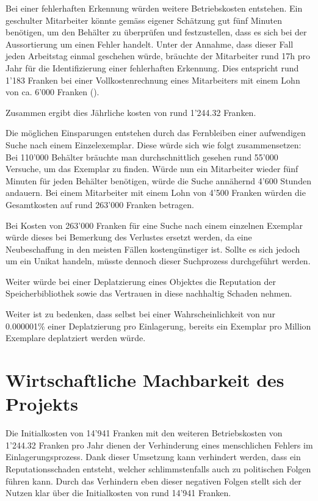 Bei einer fehlerhaften Erkennung würden weitere Betriebskosten entstehen. Ein geschulter Mitarbeiter könnte gemäss eigener Schätzung gut fünf Minuten benötigen, um den Behälter zu überprüfen und festzustellen, dass es sich bei der Aussortierung um einen Fehler handelt.
Unter der Annahme, dass dieser Fall jeden Arbeitstag einmal geschehen würde, bräuchte der Mitarbeiter rund 17h pro Jahr für die Identifizierung einer fehlerhaften Erkennung. Dies entspricht rund 1'183 Franken bei einer Vollkostenrechnung eines Mitarbeiters mit einem Lohn von ca. 6'000 Franken (\cite{KostenProMitarbeiter2013}).

Zusammen ergibt dies Jährliche kosten von rund 1'244.32 Franken.

Die möglichen Einsparungen entstehen durch das Fernbleiben einer aufwendigen Suche nach einem Einzelexemplar. Diese würde sich wie folgt zusammensetzen:
Bei 110'000 Behälter bräuchte man durchschnittlich gesehen rund 55'000 Versuche, um das Exemplar zu finden. Würde nun ein Mitarbeiter wieder fünf Minuten für jeden Behälter benötigen, würde die Suche annähernd 4'600 Stunden andauern. Bei einem Mitarbeiter mit einem Lohn von 4'500 Franken würden die Gesamtkosten auf rund 263'000 Franken betragen.

Bei Kosten von 263'000 Franken für eine Suche nach einem einzelnen Exemplar würde dieses bei Bemerkung des Verlustes ersetzt werden, da eine Neubeschaffung in den meisten Fällen kostengünstiger ist. Sollte es sich jedoch um ein Unikat handeln, müsste dennoch dieser Suchprozess durchgeführt werden.

Weiter würde bei einer Deplatzierung eines Objektes die Reputation der Speicherbibliothek sowie das Vertrauen in diese nachhaltig Schaden nehmen.

Weiter ist zu bedenken, dass selbst bei einer Wahrscheinlichkeit von nur 0.000001\% einer Deplatzierung pro Einlagerung, bereits ein Exemplar pro Million Exemplare deplatziert werden würde.

\chapter{Wirtschaftliche Machbarkeit des Projekts}
Die Initialkosten von 14'941 Franken mit den weiteren Betriebskosten von 1'244.32 Franken pro Jahr dienen der Verhinderung eines menschlichen Fehlers im Einlagerungsprozess. Dank dieser Umsetzung kann verhindert werden, dass ein Reputationsschaden entsteht, welcher schlimmstenfalls auch zu politischen Folgen führen kann.
Durch das Verhindern eben dieser negativen Folgen stellt sich der Nutzen klar über die Initialkosten von rund 14'941 Franken.

